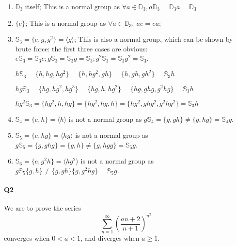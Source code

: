 \documentclass[12pt, a4paper]{article}
\theoremstyle{definition}
\theoremstyle{remark}
\begin{document}
\begin{enumerate}
	\item $\mathbb{D}_3$ itself; This is a normal group as $\forall a \in \mathbb{D}_3, a \mathbb{D}_3 = \mathbb{D}_3 a = \mathbb{D}_3$ 
	\item $\{e\}$; This is a normal group as $\forall a \in \mathbb{D}_3,\ ae= ea$;
	\item $\mathbb{S}_3=\{e, g, g^2\} = \langle g \rangle$; This is also a normal group, which can be shown by brute force: the first three cases are obvious: $e \mathbb{S}_3 = \mathbb{S}_3 e; g\mathbb{S}_3 = \mathbb{S}_3 g = \mathbb{S}_3; g^2 \mathbb{S}_3 = \mathbb{S}_3 g^2 = \mathbb{S}_3 $.
		
		$h \mathbb{S}_3 = \{h, hg, hg^2\} = \{h, hg^2 ,gh\} =\{h, gh, gh^2\}=\mathbb{S}_3 h$

		$hg \mathbb{S}_3 = \{hg, hg^2, hg^3\} = \{hg, h ,hg^2\} =\{hg, ghg, g^2hg\}=\mathbb{S}_3 h$

		$hg^2 \mathbb{S}_3 = \{hg^2, h, hg\} = \{hg^2, hg ,h\} =\{hg^2, ghg^2, g^2hg^2\}=\mathbb{S}_3 h$
	\item $\mathbb{S}_4=\{e, h\}=\langle h \rangle$ is not a normal group as $g\mathbb{S}_4 = \{g, gh\} \neq \{g, hg\} = \mathbb{S}_4g$.
	\item $\mathbb{S}_5=\{e, hg\}=\langle hg \rangle$ is not a normal group as $ g\mathbb{S}_5 = \{g, ghg\} = \{g, h\} \neq \{g, hgg\}=\mathbb{S}_5g$.
	\item $\mathbb{S}_6=\{e, g^2h\} = \langle hg^2\rangle$ is not a normal group as $ g\mathbb{S}_5 \{g, h\} \neq \{g, gh\}\{g, g^2hg\}=\mathbb{S}_5g$. 
\end{enumerate}




\newpage
\paragraph{Q2}
We are to prove the series 
\begin{equation}\label{series}
	\sum^{\infty}_{n=1}\left( \frac{an+2}{n+1}\right)^{n^2}
\end{equation}
converges when $0<a<1$, and diverges when $a \geq 1$.
\end{document}
